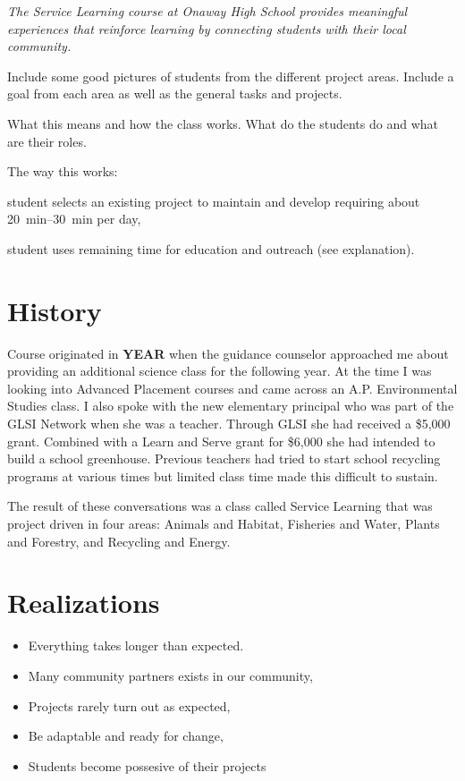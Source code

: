 \documentclass[letterpaper,10pt]{memoir}
\begin{document}
\textit{The Service Learning course at Onaway High School 
 provides meaningful experiences
 that reinforce learning
 by connecting students with their local community.}

\vspace*{3mm}
 
Include some good pictures of students from the different project areas. Include a goal from each area as well as the general tasks and projects.

\vspace*{2cm}

\noindent
What this means and how the class works. What do the students do and what are their roles.

The way this works:

	student selects an existing project to maintain and develop requiring about 
  \SIrange{20}{30}{\minute} per day, 

  student uses remaining time for education and outreach (see explanation).

  
  

\newpage
\section*{History}


Course originated in \textbf{YEAR} when the guidance counselor approached me about
providing an additional science class for the following year. At the time I was
looking into Advanced Placement courses and came across an A.P. Environmental
Studies class. I also spoke with the new elementary principal who was part of the GLSI Network when she was a teacher. Through GLSI she had received a \$5,000 grant. Combined with a Learn and Serve grant for \$6,000 she had intended to build a school greenhouse. Previous teachers had tried to start school recycling programs at various times but limited class time made this difficult to sustain.

The result of these conversations was a class called Service Learning that was project driven in four areas: Animals and Habitat, Fisheries and Water, Plants and Forestry, and Recycling and Energy.


\section*{Realizations}
\begin{itemize}
\item Everything takes longer than expected.
\item Many community partners exists in our community,
\item Projects rarely turn out as expected,
\item Be adaptable and ready for change,
\item Students become possesive of their projects
\end{itemize}
\end{document}
